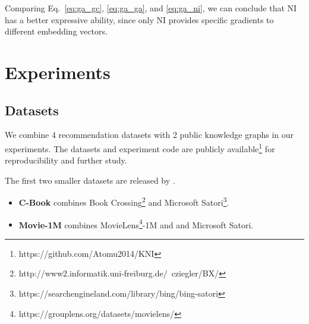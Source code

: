 \documentclass[sigconf]{acmart}
\begin{document}
{Comparing Eq.~\ref{eq:ga_gc}, \ref{eq:ga_ga}, and \ref{eq:ga_ni}, we can conclude that NI has a better expressive ability, since only NI provides specific gradients to different embedding vectors.
}

\section{Experiments} \label{sec:ex}

\begin{table}
\centering
\caption{Statistics for the expanded datasets. \emph{Note}: ``entities'' contain both items and non-item entities.}
\end{table}

\subsection{Datasets}

We combine 4 recommendation datasets with 2 public knowledge graphs in our experiments. The datasets and experiment code are publicly available\footnote{https://github.com/Atomu2014/KNI} for reproducibility and further study.

The first two smaller datasets are released by \cite{wang2018ripplenet}.

\begin{itemize}
\item \textbf{C-Book} combines Book Crossing\footnote{http://www2.informatik.uni-freiburg.de/~cziegler/BX/} and Microsoft Satori\footnote{https://searchengineland.com/library/bing/bing-satori}.
\item \textbf{Movie-1M} combines MovieLens\footnote{https://grouplens.org/datasets/movielens/}-1M and and Microsoft Satori.
\end{itemize}
\end{document}

